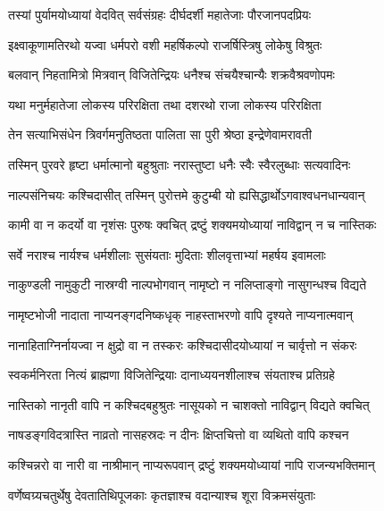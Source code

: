 
\twolineshloka
{तस्यां पुर्यामयोध्यायां वेदवित् सर्वसंग्रहः}
{दीर्घदर्शी महातेजाः पौरजानपदप्रियः} %

\twolineshloka
{इक्ष्वाकूणामतिरथो यज्वा धर्मपरो वशी}
{महर्षिकल्पो राजर्षिस्त्रिषु लोकेषु विश्रुतः} %

\twolineshloka
{बलवान् निहतामित्रो मित्रवान् विजितेन्द्रियः}
{धनैश्च संचयैश्चान्यैः शक्रवैश्रवणोपमः} %

\twolineshloka
{यथा मनुर्महातेजा लोकस्य परिरक्षिता}
{तथा दशरथो राजा लोकस्य परिरक्षिता} %

\twolineshloka
{तेन सत्याभिसंधेन त्रिवर्गमनुतिष्ठता}
{पालिता सा पुरी श्रेष्ठा इन्द्रेणेवामरावती} %

\twolineshloka
{तस्मिन् पुरवरे हृष्टा धर्मात्मानो बहुश्रुताः}
{नरास्तुष्टा धनैः स्वैः स्वैरलुब्धाः सत्यवादिनः} %

\twolineshloka
{नाल्पसंनिचयः कश्चिदासीत् तस्मिन् पुरोत्तमे}
{कुटुम्बी यो ह्यसिद्धार्थोऽगवाश्वधनधान्यवान्} %

\twolineshloka
{कामी वा न कदर्यो वा नृशंसः पुरुषः क्वचित्}
{द्रष्टुं शक्यमयोध्यायां नाविद्वान् न च नास्तिकः} %

\twolineshloka
{सर्वे नराश्च नार्यश्च धर्मशीलाः सुसंयताः}
{मुदिताः शीलवृत्ताभ्यां महर्षय इवामलाः} %

\twolineshloka
{नाकुण्डली नामुकुटी नास्रग्वी नाल्पभोगवान्}
{नामृष्टो न नलिप्ताङ्गो नासुगन्धश्च विद्यते} %

\twolineshloka
{नामृष्टभोजी नादाता नाप्यनङ्गदनिष्कधृक्}
{नाहस्ताभरणो वापि दृश्यते नाप्यनात्मवान्} %

\twolineshloka
{नानाहिताग्निर्नायज्वा न क्षुद्रो वा न तस्करः}
{कश्चिदासीदयोध्यायां न चार्वृत्तो न संकरः} %

\twolineshloka
{स्वकर्मनिरता नित्यं ब्राह्मणा विजितेन्द्रियाः}
{दानाध्ययनशीलाश्च संयताश्च प्रतिग्रहे} %

\twolineshloka
{नास्तिको नानृती वापि न कश्चिदबहुश्रुतः}
{नासूयको न चाशक्तो नाविद्वान् विद्यते क्वचित्} %

\twolineshloka
{नाषडङ्गविदत्रास्ति नाव्रतो नासहस्रदः}
{न दीनः क्षिप्तचित्तो वा व्यथितो वापि कश्चन} %

\twolineshloka
{कश्चिन्नरो वा नारी वा नाश्रीमान् नाप्यरूपवान्}
{द्रष्टुं शक्यमयोध्यायां नापि राजन्यभक्तिमान्} %

\twolineshloka
{वर्णेष्वग्र्यचतुर्थेषु देवतातिथिपूजकाः}
{कृतज्ञाश्च वदान्याश्च शूरा विक्रमसंयुताः} %

